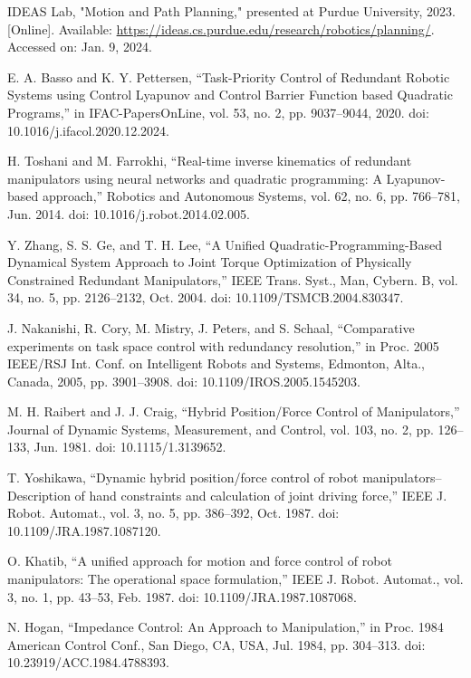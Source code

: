 \documentclass[letterpaper, 10 pt, conference]{ieeeconf}  %
\begin{document}
\begin{thebibliography}{99}
	
IDEAS Lab, "Motion and Path Planning," presented at Purdue University, 2023. [Online]. Available: \url{https://ideas.cs.purdue.edu/research/robotics/planning/}. Accessed on: Jan. 9, 2024.
	
 E. A. Basso and K. Y. Pettersen, “Task-Priority Control of Redundant Robotic Systems using Control Lyapunov and Control Barrier Function based Quadratic Programs,” in IFAC-PapersOnLine, vol. 53, no. 2, pp. 9037–9044, 2020. doi: 10.1016/j.ifacol.2020.12.2024.


 H. Toshani and M. Farrokhi, “Real-time inverse kinematics of redundant manipulators using neural networks and quadratic programming: A Lyapunov-based approach,” Robotics and Autonomous Systems, vol. 62, no. 6, pp. 766–781, Jun. 2014. doi: 10.1016/j.robot.2014.02.005.

 Y. Zhang, S. S. Ge, and T. H. Lee, “A Unified Quadratic-Programming-Based Dynamical System Approach to Joint Torque Optimization of Physically Constrained Redundant Manipulators,” IEEE Trans. Syst., Man, Cybern. B, vol. 34, no. 5, pp. 2126–2132, Oct. 2004. doi: 10.1109/TSMCB.2004.830347.

 J. Nakanishi, R. Cory, M. Mistry, J. Peters, and S. Schaal, “Comparative experiments on task space control with redundancy resolution,” in Proc. 2005 IEEE/RSJ Int. Conf. on Intelligent Robots and Systems, Edmonton, Alta., Canada, 2005, pp. 3901–3908. doi: 10.1109/IROS.2005.1545203.

 M. H. Raibert and J. J. Craig, “Hybrid Position/Force Control of Manipulators,” Journal of Dynamic Systems, Measurement, and Control, vol. 103, no. 2, pp. 126–133, Jun. 1981. doi: 10.1115/1.3139652.

 T. Yoshikawa, “Dynamic hybrid position/force control of robot manipulators--Description of hand constraints and calculation of joint driving force,” IEEE J. Robot. Automat., vol. 3, no. 5, pp. 386–392, Oct. 1987. doi: 10.1109/JRA.1987.1087120.

 O. Khatib, “A unified approach for motion and force control of robot manipulators: The operational space formulation,” IEEE J. Robot. Automat., vol. 3, no. 1, pp. 43–53, Feb. 1987. doi: 10.1109/JRA.1987.1087068.

 N. Hogan, “Impedance Control: An Approach to Manipulation,” in Proc. 1984 American Control Conf., San Diego, CA, USA, Jul. 1984, pp. 304–313. doi: 10.23919/ACC.1984.4788393.


\end{thebibliography}
\end{document}
